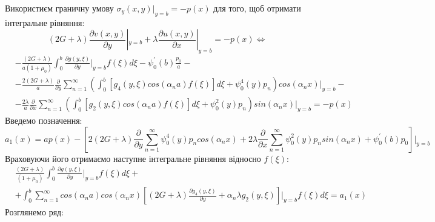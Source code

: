 Використиєм граничну умову $\sigma_y(x, y) |_{y=b} = -p(x)$ для того, щоб отримати інтегральне рівняння:
\begin{equation*}
    (2G + \lambda)\frac{\partial v(x,y)}{\partial y}|_{y=b} + \lambda\frac{\partial u(x,y)}{\partial x}|_{y=b} = -p(x) \Leftrightarrow
\end{equation*}
\begin{align*}
    &-\frac{(2G + \lambda)}{a(1+\mu_0)} \int_{0}^{b}\frac{\partial g(y, \xi)}{\partial y}|_{y=b} f(\xi) d\xi - \psi_0^{'}(b) \frac{p_0}{a} - \\
    &- \frac{2(2G + \lambda)}{a} \frac{\partial}{\partial y} \sum_{n=1}^{\infty} \left( \int_0^b \left[g_4(y, \xi) cos(\alpha_n a) f(\xi) \right]d\xi + \psi_0^{4}(y) p_n \right) cos(\alpha_n x)|_{y=b} - \\
    & -\frac{2\lambda}{a} \frac{\partial}{\partial x} \sum_{n=1}^{\infty} \left( \int_0^b \left[g_2(y, \xi)cos(\alpha_n a) f(\xi) \right]d\xi + \psi_0^2(y) p_n \right) sin(\alpha_n x)|_{y=b} = -p(x)
\end{align*}
Введемо позначення:
\begin{equation}
    a_1(x) = a p(x) - \left[ 2(2G + \lambda) \frac{\partial}{\partial y} \sum_{n=1}^{\infty} \psi_0^{4}(y) p_n cos(\alpha_n x) + 2\lambda \frac{\partial}{\partial x} \sum_{n=1}^{\infty}\psi_0^2(y) p_n sin(\alpha_n x) + \psi_0^{'}(b) p_0\right]|_{y=b}
\end{equation}
Враховуючи його отримаємо наступне інтегральне рівняння відносно $f(\xi)$:
\begin{align}\label{int_gen}
    &\frac{(2G + \lambda)}{(1+\mu_0)} \int_{0}^{b}\frac{\partial g(y, \xi)}{\partial y}|_{y=b} f(\xi) d\xi + \\ 
    &+ \int_{0}^{b} \sum_{n=1}^{\infty} cos(\alpha_n a) cos(\alpha_n x) \left[(2G + \lambda) \frac{\partial g_4(y, \xi)}{\partial y} + \alpha_n \lambda g_2(y, \xi) \right]|_{y=b} f(\xi) d\xi = a_1(x)
\end{align}
Розглянемо ряд:
